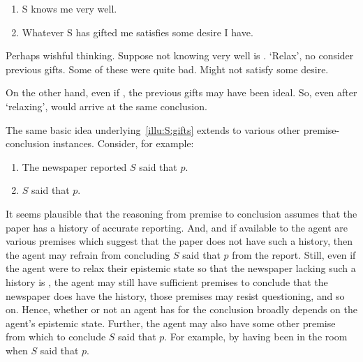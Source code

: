 \begin{note}[Gifts]
  \begin{illustration}
    \label{illu:S:gifts}
    \begin{enumerate}
    \item S knows me very well.
    \item Whatever S has gifted me satisfies some desire I have.
    \end{enumerate}
  \end{illustration}
  Perhaps wishful thinking.
  Suppose not knowing very well is \epPAd{}.
  `Relax', no consider previous gifts.
  Some of these were quite bad.
  Might not satisfy some desire.

  On the other hand, even if \epPAd{}, the previous gifts may have been ideal.
  So, even after `relaxing', would arrive at the same conclusion.

  The same basic idea underlying~\autoref{illu:S:gifts} extends to various other premise-conclusion instances.
  Consider, for example:
  \begin{enumerate}
  \item The newspaper reported \(S\) said that \(p\).
  \item \(S\) said that \(p\).
  \end{enumerate}
  It seems plausible that the reasoning from premise to conclusion assumes that the paper has a history of accurate reporting.
  And, and if available to the agent are various premises which suggest that the paper does not have such a history, then the agent may refrain from concluding \(S\) said that \(p\) from the report.
  Still, even if the agent were to relax their epistemic state so that the newspaper lacking such a history is \epVAd{}, the agent may still have sufficient premises to conclude that the newspaper does have the history, those premises may resist questioning, and so on.
  Hence, whether or not an agent has \support{} for the conclusion broadly depends on the agent's epistemic state.
  Further, the agent may also have some other premise from which to conclude \(S\) said that \(p\).
  For example, by having been in the room when \(S\) said that \(p\).
\end{note}

